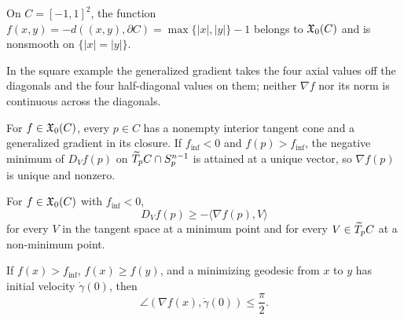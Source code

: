 \begin{example}
\label{ex:chow-iii-h34-square-convex-function}
On $C=[-1,1]^2$, the function $f(x,y)=-d((x,y),\partial C)=\max\{|x|,|y|\}-1$
belongs to $\mathfrak X_0(C)$ and is nonsmooth on $\{|x|=|y|\}$.
\end{example}

\begin{remark}
\label{rem:chow-iii-h35-square-gradient}
In the square example the generalized gradient takes the four axial values off the
diagonals and the four half-diagonal values on them; neither $\nabla f$ nor its norm
is continuous across the diagonals.
\end{remark}

\begin{lemma}
\label{lem:chow-iii-h36-unique-generalized-gradient}
For $f\in\mathfrak X_0(C)$, every $p\in C$ has a nonempty interior tangent cone and a
generalized gradient in its closure.  If $f_{\inf}<0$ and $f(p)>f_{\inf}$, the negative
minimum of $D_Vf(p)$ on $\widetilde T_pC\cap S_p^{n-1}$ is attained at a unique vector, so
$\nabla f(p)$ is unique and nonzero.
\end{lemma}

\begin{lemma}
\label{lem:chow-iii-h37-directional-gradient-inequality}
For $f\in\mathfrak X_0(C)$ with $f_{\inf}<0$,
\[
D_Vf(p)\ge-\langle\nabla f(p),V\rangle
\]
for every $V$ in the tangent space at a minimum point and for every $V\in\widetilde T_pC$
at a non-minimum point.
\end{lemma}

\begin{lemma}
\label{lem:chow-iii-h38-acute-angle}
If $f(x)>f_{\inf}$, $f(x)\ge f(y)$, and a minimizing geodesic from $x$ to $y$ has
initial velocity $\dot\gamma(0)$, then
\[
\angle(\nabla f(x),\dot\gamma(0))\le\frac\pi2.
\]
\end{lemma}

